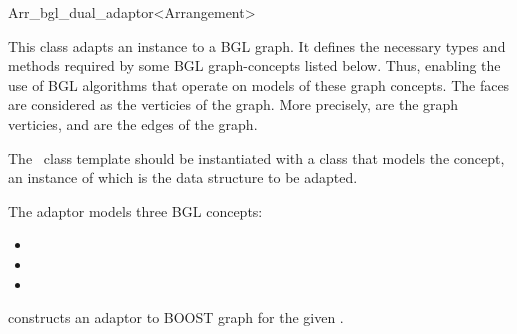 
\ccRefPageBegin

\begin{ccRefClass}{Arr_bgl_dual_adaptor<Arrangement>}
    
\ccDefinition

This class adapts an  instance to a BGL graph. It defines 
the necessary types and methods required by some BGL graph-concepts listed 
below. Thus, enabling the use of BGL algorithms that operate on models of
these graph concepts. The  faces are considered as the 
verticies of the graph. More precisely,  
are the graph verticies, and  are the 
edges of the graph.

The \ccClassTemplateName\ class template should be instantiated with a 
class that models the  concept, an instance of which is 
the data structure to be adapted.

The adaptor models three BGL concepts:
\begin{itemize}
\item {}
\item {}
\item {}
\end{itemize}


\ccCreation
{}
    
    {constructs an adaptor to BOOST graph for the given .}
    
\ccSeeAlso
    \\

\end{ccRefClass}

\ccRefPageEnd
